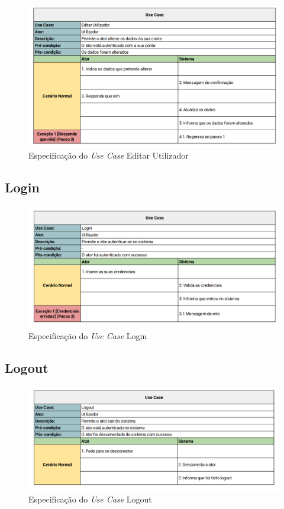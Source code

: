 \documentclass[a4paper]{report}
\begin{document}
\begin{figure}[H]
	\centering 
    \includegraphics[width=\textwidth]{images/Definir_Password.png}  
    \caption{Especificação do \emph{Use Case} Editar Utilizador}
\end{figure}

\subsection{Login}

\begin{figure}[H]
	\centering 
    \includegraphics[width=\textwidth]{images/Login.png}  
	\caption{Especificação do \emph{Use Case} Login}
\end{figure}

\subsection{Logout}

\begin{figure}[H]
	\centering 
    \includegraphics[width=\textwidth]{images/Logout.png}  
    \caption{Especificação do \emph{Use Case} Logout}
\end{figure}
\end{document}
